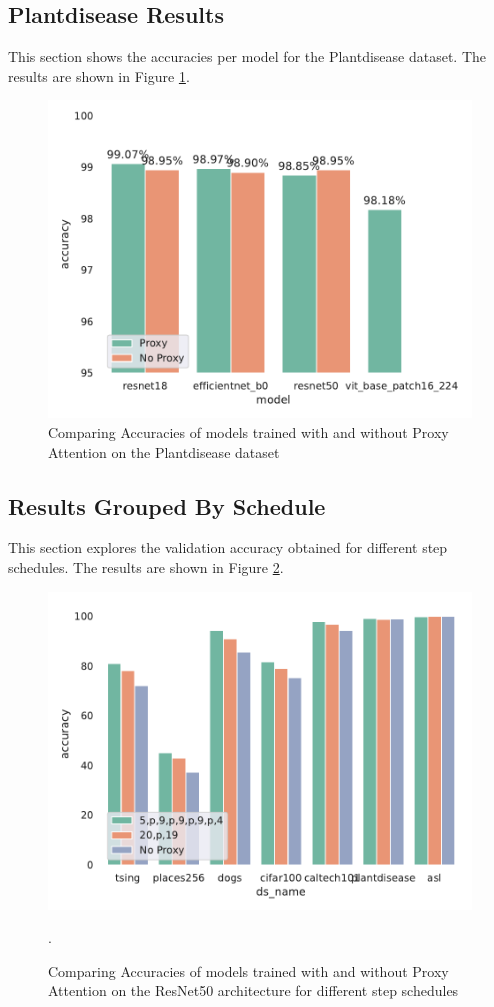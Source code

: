 \subsection{Plantdisease Results}
This section shows the accuracies per model for the Plantdisease dataset. The results are shown in Figure \ref{fig:plantdisease_results}. 
\begin{figure}[H]
    \centering
    \includegraphics[width=1\textwidth]{results/plantdisease_results.pdf}
    \caption{Comparing Accuracies of models trained with and without Proxy Attention on the Plantdisease dataset}
    \label{fig:plantdisease_results}
\end{figure}


\subsection{Results Grouped By Schedule}
This section explores the validation accuracy obtained for different step schedules. The results are shown in Figure \ref{fig:schedresnet50_results}. 
\begin{figure}[H]
    \centering
    \includegraphics[width=1\textwidth]{results/schedule_resnet50.pdf}
    \caption{Comparing Accuracies of models trained with and without Proxy Attention on the ResNet50 \cite{heDeepResidualLearning2016} architecture for different step schedules}.
    \label{fig:schedresnet50_results}
\end{figure}


